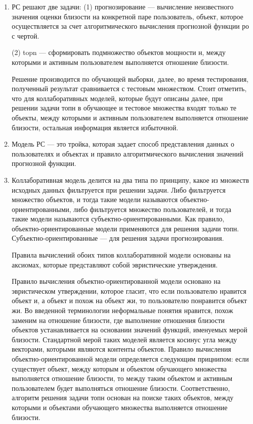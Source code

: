 \documentclass[a4paper,11pt]{proc}
\begin{document}
{\begin{enumerate}
	\item
		РС решают две задачи: (1) прогнозирование --- вычисление
	неизвестного значения оценки близости на конкретной паре пользователь, объект,
	которое осуществляется за счет алгоритмического вычисления прогнозной
	функции ро с чертой.

	(2) topn --- сформировать подмножество объектов мощности н,
	между которыми и активным пользователем выполняется отношение близости.

	Решение производится по обучающей выборки, далее, во время тестирования,
	полученный результат сравнивается с тестовым множеством.
	Стоит отметить, что для коллаборативных моделей, которые будут описаны
		далее, при решении задачи топн в обучающее и тестовое множества входят
		только те объекты, между которыми и активным пользователем выполняется
		отношение близости, остальная информация является избыточной.

	\item Модель РС --- это тройка, которая задает способ представления
		данных о пользователях и объектах и правило алгоритмического вычисления
		значений прогнозной функции.

	\item Коллаборативная модель делится на два типа по принципу, какое
		из множеств исходных данных фильтруется при решении задачи.
		Либо фильтруется множество объектов, и тогда такие модели называются объектно-ориентированными,
		либо фильтруется множество пользователей, и тогда такие модели
		называются субъектно-ориентированными. Как правило,
		объектно-ориентированные модели применяются для решения задачи топн.
		Субъектно-ориентированные --- для решения задачи прогнозирования.

		Правила вычислений обоих типов коллаборативной модели основаны на
		аксиомах, которые представляют собой эвристические утверждения.

		Правило вычисления объектно-ориентированной модели основано на
		эвристическом утверждении, которое гласит, что если пользователю
		нравится объект и, а объект и похож на объект жи, то пользователю
		понравится объект жи.
		Во введенной терминологии неформальные понятия
		нравится, похож заменим на отношение близости, где выполнение
		отношения близости объектов устанавливается на основании значений
		функций, именуемых мерой близости. Стандартной мерой таких моделей
		является косинус угла между векторами, которыми являются контенты
		объектов. Правило вычисления объектно-ориентированной модели
		определяется следующим прицнипом: если существует объект, между которым и
		объектом обучающего множества выполняется отношение близости,
		то между таким объектом и активным пользователем будет выполняться отношение
		близости. Соответственно, алгоритм решения
		задачи топн основан на поиске таких объектов, между которыми и
		объектами обучающего множества выполняется отношение близости.


\end{enumerate}}
\end{document}
